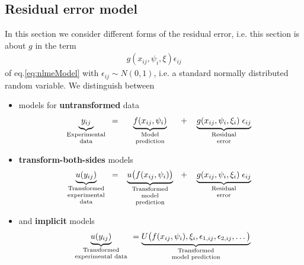 \subsection{Residual error model}
\label{sec:residualErrorModel}
\label{maths:error_model}
\label{maths:combined-err-model}
In this section we consider different forms of the residual error, i.e. this section is about $g$ in the term
\begin{align*}
g(x_{ij}, \psi_{i}, \xi) \epsilon_{ij}
\end{align*}
of eq.\ref{eq:nlmeModel} with $\epsilon_{ij} \sim N(0, 1)$, i.e. a standard normally distributed random variable. We distinguish between
\begin{itemize}\addtolength{\itemsep}{-.95\baselineskip}
\item
models for \textbf{untransformed} data
\begin{align*}
 \underbrace{ y_{ij}}_{\text{\parbox{2cm}{\centering Experimental \\[-4pt]  data}}} =
 \underbrace{ f(x_{ij}, \psi_{i})}_{\text{\parbox{2.5cm}{\centering Model \\[-4pt]  prediction}}} +
 \underbrace{ g(x_{ij}, \psi_{i}, \xi_i) \; \epsilon_{ij}}_{\text{\parbox{3cm}{\centering Residual \\[-4pt] error}}}
 \end{align*}
 \item
\textbf{transform-both-sides} models
\begin{eqnarray}
 \underbrace{ u(y_{ij})}_{\text{\parbox{2cm}{\centering Transformed \\[-4pt] experimental \\[-4pt]  data}}} =
 \underbrace{ u\big(f(x_{ij}, \psi_{i})\big)}_{\text{\parbox{2.5cm}{\centering Transformed \\[-4pt]  model \\[-4pt]  prediction}}} +
 \underbrace{ g(x_{ij}, \psi_{i}, \xi_i) \; \epsilon_{ij}}_{\text{\parbox{3cm}{\centering Residual \\[-4pt] error}}} \nonumber
 \end{eqnarray}
 \item
and \textbf{implicit} models
\begin{eqnarray}
 \underbrace{ u(y_{ij})}_{\text{\parbox{2.5cm}{\centering Transformed \\[-4pt] experimental  data}}} =
 \underbrace{ U\big(f(x_{ij}, \psi_{i}),\xi_i, \epsilon_{1,ij}, \epsilon_{2,ij}, \dots\big)}_{\text{\parbox{2.5cm}{\centering Transformed \\[-4pt]  model prediction}}}
 \end{eqnarray}
\end{itemize}

